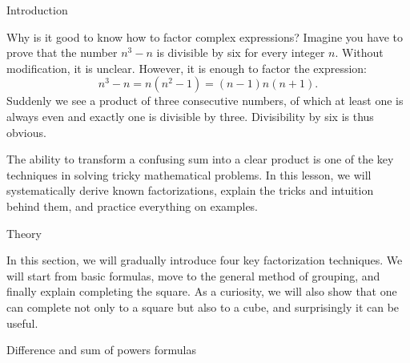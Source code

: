 





\sec Introduction

Why is it good to know how to factor complex expressions? Imagine you have to prove that the number $n^3-n$ is divisible by six for every integer $n$. Without modification, it is unclear. However, it is enough to factor the expression:
$$
n^3-n = n(n^2-1) = (n-1)n(n+1).
$$
Suddenly we see a product of three consecutive numbers, of which at least one is always even and exactly one is divisible by three. Divisibility by six is thus obvious.

The ability to transform a confusing sum into a clear product is one of the key techniques in solving tricky mathematical problems. In this lesson, we will systematically derive known factorizations, explain the tricks and intuition behind them, and practice everything on examples.

\sec Theory 

In this section, we will gradually introduce four key factorization techniques. We will start from basic formulas, move to the general method of grouping, and finally explain completing the square. As a curiosity, we will also show that one can complete not only to a square but also to a cube, and surprisingly it can be useful.

\secc Difference and sum of powers formulas




